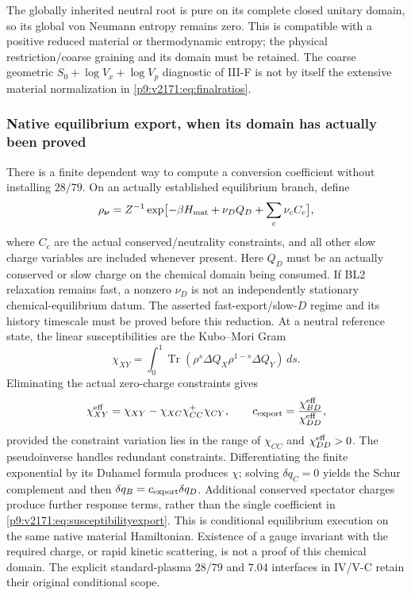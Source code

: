 \documentclass[12pt,a4paper]{article}
\begin{document}
The globally inherited neutral root is pure on its complete closed unitary
domain, so its global von Neumann entropy remains zero. This is compatible
with a positive reduced material or thermodynamic entropy; the physical
restriction/coarse graining and its domain must be retained. The coarse
geometric $S_0+\log V_x+\log V_p$ diagnostic of III-F is not by itself
the extensive material normalization in \eqref{p9:v2171:eq:finalratios}.

\subsubsection{Native equilibrium export, when its domain has actually been proved}
There is a finite dependent way to compute a conversion coefficient without
installing $28/79$. On an actually established equilibrium branch, define
\[
 \rho_{\boldsymbol\nu}=Z^{-1}
 \exp\bigl[-\beta H_{\rm mat}+\nu_DQ_D+\sum_c\nu_c C_c\bigr],
\]
where $C_c$ are the actual conserved/neutrality constraints, and all other
slow charge variables are included whenever present. Here $Q_D$ must be an
actually conserved or slow charge on the chemical domain being consumed.
If BL2 relaxation remains fast, a nonzero $\nu_D$ is not an independently
stationary chemical-equilibrium datum. The asserted fast-export/slow-$D$
regime and its history timescale must be proved before this reduction.
At a neutral reference
state, the linear susceptibilities are the Kubo--Mori Gram
\[
 \chi_{XY}=\int_0^1\operatorname{Tr}
  (\rho^s\Delta Q_X\rho^{1-s}\Delta Q_Y)\,ds.
\]
Eliminating the actual zero-charge constraints gives
\begin{equation}
 \chi^{\rm eff}_{XY}
 =\chi_{XY}-\chi_{XC}\chi_{CC}^{+}\chi_{CY},\qquad
 c_{\rm export}=\frac{\chi^{\rm eff}_{BD}}{\chi^{\rm eff}_{DD}},
 \label{p9:v2171:eq:susceptibilityexport}
\end{equation}
provided the constraint variation lies in the range of $\chi_{CC}$ and
$\chi^{\rm eff}_{DD}>0$. The pseudoinverse handles redundant constraints.
Differentiating the finite exponential by its Duhamel formula produces
$\chi$; solving $\delta q_C=0$ yields the Schur complement and then
$\delta q_B=c_{\rm export}\delta q_D$.
Additional conserved spectator charges produce further response terms,
rather than the single coefficient in \eqref{p9:v2171:eq:susceptibilityexport}.
This is conditional equilibrium execution on the same native material
Hamiltonian. Existence of a gauge invariant with the required charge,
or rapid kinetic scattering, is not a proof of this chemical domain.
The explicit standard-plasma $28/79$ and $7.04$ interfaces in IV/V-C retain
their original conditional scope.
\end{document}
